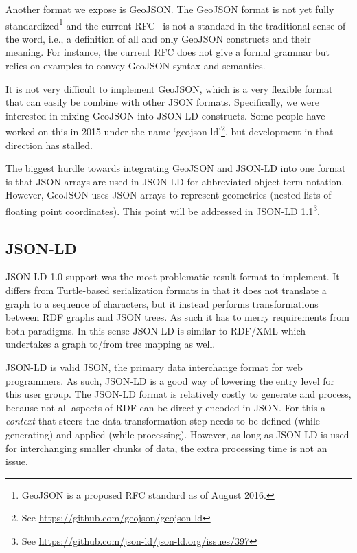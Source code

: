 \documentclass[a4paper]{scrartcl}
\begin{document}
Another format we expose is GeoJSON.  The GeoJSON format is not yet
fully standardized\footnote{GeoJSON is a proposed RFC standard as of
  August 2016.} and the current RFC~\cite{Butler2016} is not a
standard in the traditional sense of the word, i.e., a definition of
all and only GeoJSON constructs and their meaning.  For instance, the
current RFC does not give a formal grammar but relies on examples to
convey GeoJSON syntax and semantics.

It is not very difficult to implement GeoJSON, which is a very
flexible format that can easily be combine with other JSON formats.
Specifically, we were interested in mixing GeoJSON into JSON-LD
constructs.  Some people have worked on this in 2015 under the name
`geojson-ld'\footnote{See
  \url{https://github.com/geojson/geojson-ld}}, but development in
that direction has stalled.

The biggest hurdle towards integrating GeoJSON and JSON-LD into one
format is that JSON arrays are used in JSON-LD for abbreviated object
term notation.  However, GeoJSON uses JSON arrays to represent
geometries (nested lists of floating point coordinates).
This point will be addressed in JSON-LD 1.1\footnote{See \url{https://github.com/json-ld/json-ld.org/issues/397}}.


\subsection{JSON-LD}
\label{sec:jsonld}

JSON-LD 1.0 support was the most problematic result format to
implement.  It differs from Turtle-based serialization formats in that
it does not translate a graph to a sequence of characters, but it
instead performs transformations between RDF graphs and JSON trees.
As such it has to merry requirements from both paradigms.  In this
sense JSON-LD is similar to RDF/XML which undertakes a graph to/from
tree mapping as well.

JSON-LD is valid JSON, the primary data interchange format for web
programmers.  As such, JSON-LD is a good way of lowering the entry
level for this user group.  The JSON-LD format is relatively costly to
generate and process, because not all aspects of RDF can be directly
encoded in JSON.  For this a \emph{context} that steers the data
transformation step needs to be defined (while generating) and applied
(while processing).  However, as long as JSON-LD is used for
interchanging smaller chunks of data, the extra processing time is not
an issue.
\end{document}

